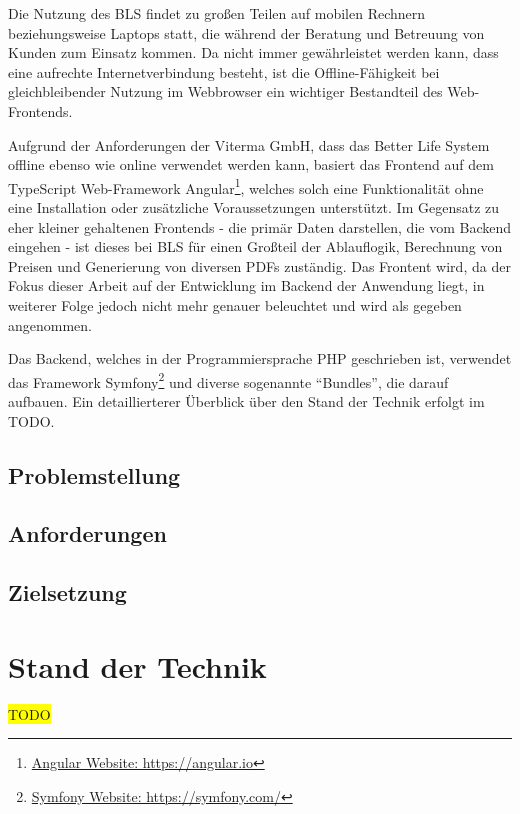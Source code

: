 \documentclass[a4paper,12pt,twoside]{scrreprt}
\begin{document}
Die Nutzung des BLS findet zu großen Teilen auf mobilen Rechnern beziehungsweise Laptops statt, die während der Beratung und Betreuung von Kunden zum Einsatz kommen. Da nicht immer gewährleistet werden kann, dass eine aufrechte Internetverbindung besteht, ist die Offline-Fähigkeit bei gleichbleibender Nutzung im Webbrowser ein wichtiger Bestandteil des Web-Frontends.

Aufgrund der Anforderungen der Viterma GmbH, dass das Better Life System offline ebenso wie online verwendet werden kann, basiert das Frontend auf dem TypeScript Web-Framework Angular\footnote{\href{https://angular.io/}{Angular Website: https://angular.io}}, welches solch eine Funktionalität ohne eine Installation oder zusätzliche Voraussetzungen unterstützt. Im Gegensatz zu eher kleiner gehaltenen Frontends - die primär Daten darstellen, die vom Backend eingehen - ist dieses bei BLS für einen Großteil der Ablauflogik, Berechnung von Preisen und Generierung von diversen PDFs zuständig. Das Frontent wird, da der Fokus dieser Arbeit auf der Entwicklung im Backend der Anwendung liegt, in weiterer Folge jedoch nicht mehr genauer beleuchtet und wird als gegeben angenommen.

Das Backend, welches in der Programmiersprache PHP geschrieben ist, verwendet das Framework Symfony\footnote{\href{https://symfony.com/}{Symfony Website: https://symfony.com/}} und diverse sogenannte \enquote{Bundles}, die darauf aufbauen. Ein detaillierterer Überblick über den Stand der Technik erfolgt im TODO.

\section{Problemstellung}


\section{Anforderungen}

\section{Zielsetzung}

\chapter{Stand der Technik}
\colorbox{yellow}{TODO}

\clearpage
{}
{}
\printbibliography
\end{document}
